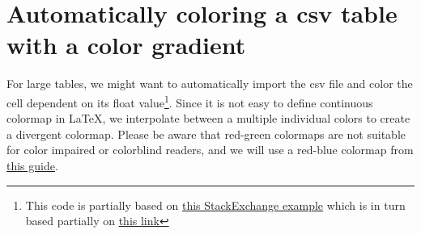 \documentclass{article}
\begin{document}
\section{Automatically coloring a csv table with a color gradient}
For large tables, we might want to automatically import the csv file and color the cell dependent on its float value\footnote{This code is partially based on \href{https://tex.stackexchange.com/questions/174998/are-there-an-easy-way-to-coloring-tables-depending-on-the-value-in-each-cell}{this StackExchange example} 
which is in turn based partially on \href{https://www.siavoosh.com/blog/2019/01/05/latex-table-cell-coloring-based-on-values-in-the-cell/\#respond}{this link}}.
Since it is not easy to define continuous colormap in \LaTeX, we interpolate between a multiple individual colors to create a divergent colormap.
Please be aware that red-green colormaps are not suitable for color impaired or colorblind readers, and we will use a red-blue colormap from \href{https://www.nceas.ucsb.edu/sites/default/files/2022-06/Colorblind%20Safe%20Color%20Schemes.pdf}{this guide}.
\end{document}
